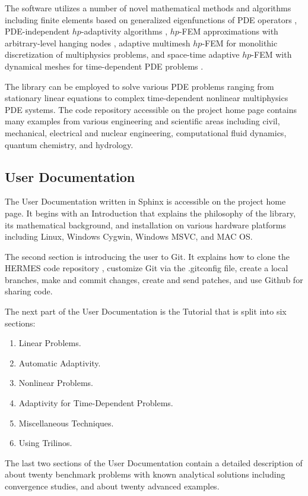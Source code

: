 \documentclass[final,3p,times,twocolumn]{elsarticle}
\begin{document}
The software utilizes a number of novel mathematical methods and 
algorithms including finite elements based on generalized eigenfunctions 
of PDE operators \cite{eigen,hermite}, 
PDE-independent $hp$-adaptivity algorithms \cite{pdeindep}, 
$hp$-FEM approximations with arbitrary-level hanging nodes \cite{hangno-1,hangno-2}, 
adaptive multimesh $hp$-FEM  for monolithic discretization of 
multiphysics problems, and
space-time adaptive $hp$-FEM with dynamical meshes for time-dependent PDE problems 
\cite{spacetime-1,spacetime-2}. 

The library can be employed to solve various PDE problems ranging 
from stationary linear equations to complex 
time-dependent nonlinear multiphysics PDE systems. The code repository \cite{hermes-repo}
accessible on the project home page contains many examples from various 
engineering and scientific areas including civil, mechanical, 
electrical and nuclear engineering, computational fluid dynamics, 
quantum chemistry, and hydrology.

\subsection{User Documentation}

The User Documentation %
written in Sphinx
is accessible on the project home page. It begins with an Introduction that explains the 
philosophy of the library, its mathematical background, and installation
on various hardware platforms including Linux, Windows Cygwin, Windows MSVC,
and MAC OS. 

The second section is introducing the user to Git. It explains how to 
clone the HERMES code repository \cite{hermes-repo}, customize Git via the .gitconfig file, 
create a local branches, make and commit changes, create and send patches,
and use Github for sharing code. 

The next part of the User Documentation is the Tutorial that is split 
into six sections:

\begin{enumerate}
\item Linear Problems.
\item Automatic Adaptivity.
\item Nonlinear Problems.
\item Adaptivity for Time-Dependent Problems.
\item Miscellaneous Techniques.
\item Using Trilinos.
\end{enumerate}
The last two sections of the User Documentation contain 
a detailed description of about twenty benchmark problems
with known analytical solutions including convergence studies, 
and about twenty advanced examples. 
\end{document}
